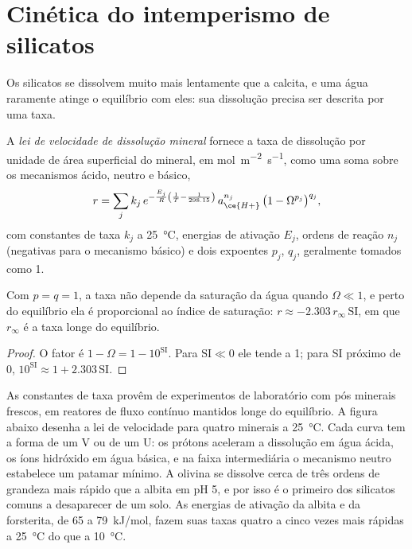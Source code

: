 \section{Cinética do intemperismo de silicatos}\label{sec:b3:water-rock-interaction:kinetics}

Os silicatos se dissolvem muito mais lentamente que a calcita, e uma água raramente atinge o equilíbrio com eles:
sua dissolução precisa ser descrita por uma taxa.

\begin{definition}\label{def:b3:water-rock-interaction:rate-law}
A \emph{lei de velocidade de dissolução mineral}
fornece a taxa de dissolução por unidade de área superficial do mineral, em
\unit{mol.m^{-2}.s^{-1}}, como uma soma sobre os mecanismos ácido, neutro e básico,
\[
r = \sum_j k_j\,e^{-\frac{E_j}{R}\left(\frac1T - \frac1{298.15}\right)}\,
a_{\ce{H+}}^{n_j}\,\bigl(1 - \Omega^{p_j}\bigr)^{q_j},
\]
com constantes de taxa $k_j$ a \qty{25}{\celsius}, energias de ativação $E_j$,
ordens de reação $n_j$ (negativas para o mecanismo básico) e dois expoentes
$p_j$, $q_j$, geralmente tomados como 1.
\end{definition}

\begin{proposition}\label{prop:b3:water-rock-interaction:affinity}
Com $p = q = 1$, a taxa não depende da saturação da água
quando $\Omega \ll 1$, e perto do equilíbrio ela é proporcional ao
índice de saturação: $r \approx -2.303\,r_\infty\,\mathrm{SI}$, em que
$r_\infty$ é a taxa longe do equilíbrio.
\end{proposition}

\begin{proof}
O fator é $1 - \Omega = 1 - 10^{\mathrm{SI}}$. Para $\mathrm{SI} \ll 0$ ele
tende a 1; para $\mathrm{SI}$ próximo de 0, $10^{\mathrm{SI}} \approx 1 +
2.303\,\mathrm{SI}$.
\end{proof}

As constantes de taxa provêm de experimentos de laboratório com pós minerais frescos,
em reatores de fluxo contínuo mantidos longe do equilíbrio. A figura abaixo desenha
a lei de velocidade para quatro minerais a \qty{25}{\celsius}. Cada curva tem a forma de um V ou de um
U: os prótons aceleram a dissolução em água ácida, os íons hidróxido em água básica, e
na faixa intermediária o mecanismo neutro estabelece um patamar mínimo. A olivina se dissolve cerca de três
ordens de grandeza mais rápido que a albita em pH 5, e por isso é o primeiro dos silicatos comuns
a desaparecer de um solo. As energias de ativação da albita e da forsterita,
de 65 a \qty{79}{kJ/mol}, fazem suas taxas quatro a cinco
vezes mais rápidas a \qty{25}{\celsius} do que a \qty{10}{\celsius}.


